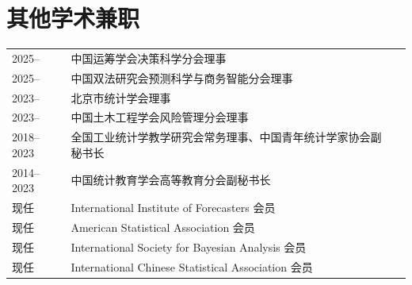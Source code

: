 \documentclass[twoside,a4paper,11pt]{article}
\begin{document}
\section{其他学术兼职}
\begin{tabular}{l p{} l}
  2025--     & 中国运筹学会决策科学分会理事 \\
  2025--     & 中国双法研究会预测科学与商务智能分会理事\\
  2023--     & 北京市统计学会理事                                             \\
  2023--     & 中国土木工程学会风险管理分会理事                               \\
  2018--2023 & 全国工业统计学教学研究会常务理事、中国青年统计学家协会副秘书长 \\
  2014--2023 & 中国统计教育学会高等教育分会副秘书长                         \\
  现任 & International Institute of Forecasters 会员 \\
  现任 & American Statistical Association 会员 \\
  现任 & International Society for Bayesian Analysis 会员 \\
  现任 & International Chinese Statistical Association 会员 \\
\end{tabular}


\end{document}
